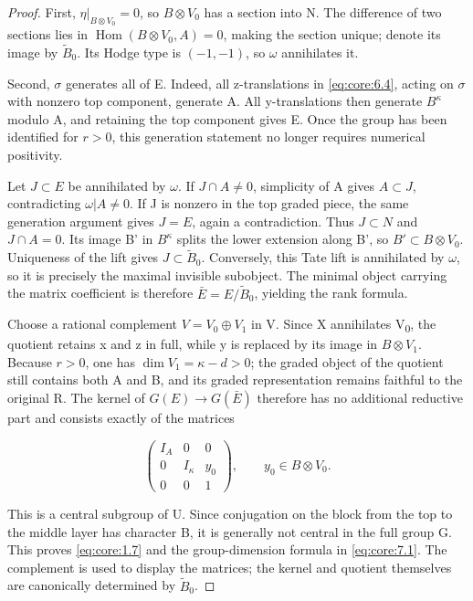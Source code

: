 \documentclass[11pt,a4paper,oneside]{article}
\theoremstyle{plain}
\theoremstyle{definition}
\theoremstyle{remark}
\numberwithin{equation}{section}
\begin{document}
\begin{proof}

First, \(\eta|_{B\otimes V_0}=0\), so \(B\otimes V_{0}\) has a section into N. The difference of two sections lies in \(\operatorname{Hom}(B\otimes V_0,A)=0\), making the section unique; denote its image by \(\widetilde B_0\). Its Hodge type is \((- 1,- 1)\), so \(\omega \) annihilates it.

Second, \(\sigma \) generates all of E. Indeed, all z-translations in \eqref{eq:core:6.4}, acting on \(\sigma \) with nonzero top component, generate A. All y-translations then generate \(B^\kappa \) modulo A, and retaining the top component gives E. Once the group has been identified for \(r>0\), this generation statement no longer requires numerical positivity.

Let \(J\subset E\) be annihilated by \(\omega \). If \(J\cap A\ne 0\), simplicity of A gives \(A\subset J\), contradicting \(\omega|A\ne0\). If J is nonzero in the top graded piece, the same generation argument gives \(J=E\), again a contradiction. Thus \(J\subset N\) and \(J\cap A=0\). Its image B' in \(B^\kappa \) splits the lower extension along B', so \(B'\subset B\otimes V_{0}\). Uniqueness of the lift gives \(J\subset\widetilde B_0\). Conversely, this Tate lift is annihilated by \(\omega \), so it is precisely the maximal invisible subobject. The minimal object carrying the matrix coefficient is therefore \(\bar E=E/\widetilde B_0\), yielding the rank formula.

Choose a rational complement \(V=V_0\oplus V_1\) in V. Since X annihilates V\textsubscript{0}, the quotient retains x and z in full, while y is replaced by its image in \(B\otimes V_{1}\). Because \(r>0\), one has \(\dim V_1=\kappa-d>0\); the graded object of the quotient still contains both A and B, and its graded representation remains faithful to the original R. The kernel of \(G(E)\to G(\bar E)\) therefore has no additional reductive part and consists exactly of the matrices

\begin{equation}
\begin{pmatrix}I_A&0&0\\0&I_\kappa&y_0\\0&0&1\end{pmatrix},
                 \qquad y_0\in B\otimes V_0.             \label{eq:core:7.2}
\end{equation}

This is a central subgroup of U. Since conjugation on the block from the top to the middle layer has character B, it is generally not central in the full group G. This proves \eqref{eq:core:1.7} and the group-dimension formula in \eqref{eq:core:7.1}. The complement is used to display the matrices; the kernel and quotient themselves are canonically determined by \(\widetilde B_0\).


\end{proof}
\end{document}
